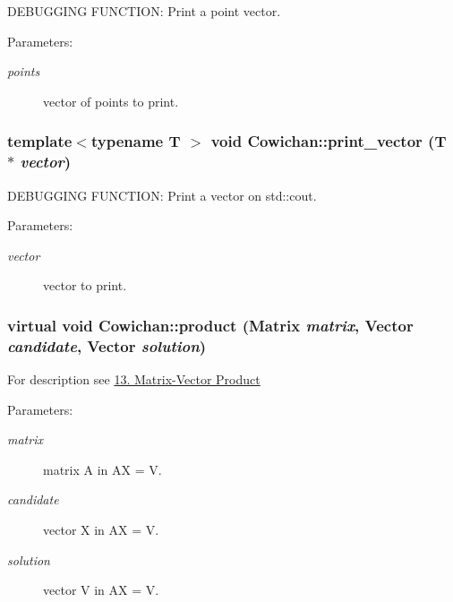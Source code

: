 DEBUGGING FUNCTION: Print a point vector. \begin{Desc}
\item[Parameters:]
\begin{description}
\item[{\em points}]vector of points to print. \end{description}
\end{Desc}
\hypertarget{class_cowichan_90f1155f5c35308796b142b15d681a4b}{
\subsubsection[{print\_\-vector}]{\setlength{\rightskip}{0pt plus 5cm}template$<$typename T $>$ void Cowichan::print\_\-vector (T $\ast$ {\em vector})}}
\label{class_cowichan_90f1155f5c35308796b142b15d681a4b}


DEBUGGING FUNCTION: Print a vector on std::cout. \begin{Desc}
\item[Parameters:]
\begin{description}
\item[{\em vector}]vector to print. \end{description}
\end{Desc}
\hypertarget{class_cowichan_3d7d4b581a1d6f0392dc452830fb3b03}{
\subsubsection[{product}]{\setlength{\rightskip}{0pt plus 5cm}virtual void Cowichan::product ({\bf Matrix} {\em matrix}, \/  {\bf Vector} {\em candidate}, \/  {\bf Vector} {\em solution})}}
\label{class_cowichan_3d7d4b581a1d6f0392dc452830fb3b03}


For description see \hyperlink{index_product_sec}{13. Matrix-Vector Product} \begin{Desc}
\item[Parameters:]
\begin{description}
\item[{\em matrix}]matrix A in AX = V. \item[{\em candidate}]vector X in AX = V. \item[{\em solution}]vector V in AX = V. \end{description}
\end{Desc}


